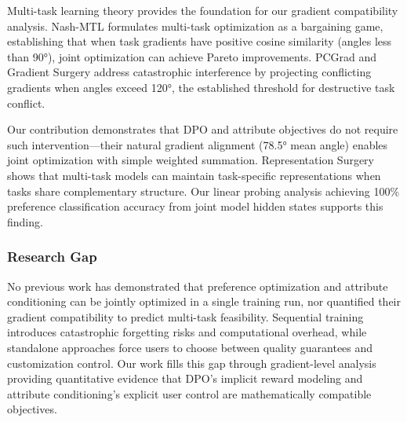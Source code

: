 Multi-task learning theory provides the foundation for our gradient compatibility analysis. Nash-MTL \citep{Navon2022NashMTL} formulates multi-task optimization as a bargaining game, establishing that when task gradients have positive cosine similarity (angles less than 90°), joint optimization can achieve Pareto improvements. PCGrad \citep{Yu2020PCGrad} and Gradient Surgery \citep{Wang2020GradientSurgery} address catastrophic interference by projecting conflicting gradients when angles exceed 120°, the established threshold for destructive task conflict.

Our contribution demonstrates that DPO and attribute objectives do not require such intervention---their natural gradient alignment (78.5° mean angle) enables joint optimization with simple weighted summation. Representation Surgery \citep{Yang2024RepresentationSurgery} shows that multi-task models can maintain task-specific representations when tasks share complementary structure. Our linear probing analysis achieving 100\% preference classification accuracy from joint model hidden states supports this finding.

\subsubsection{Research Gap}

No previous work has demonstrated that preference optimization and attribute conditioning can be jointly optimized in a single training run, nor quantified their gradient compatibility to predict multi-task feasibility. Sequential training introduces catastrophic forgetting risks and computational overhead, while standalone approaches force users to choose between quality guarantees and customization control. Our work fills this gap through gradient-level analysis providing quantitative evidence that DPO's implicit reward modeling and attribute conditioning's explicit user control are mathematically compatible objectives.

